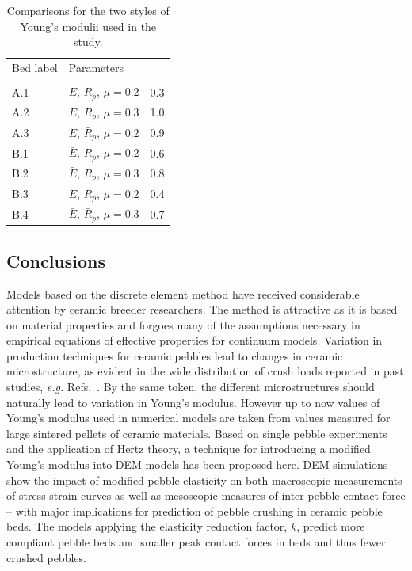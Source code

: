 \begin{table}[t]
\caption{Comparisons for the two styles of Young's modulii used in the study. }
\label{tab:num-crush-percent}\centering
\begin{tabular}{llS[table-format=3.2]}
\toprule
Bed label		& 		Parameters 								&				\\
				& 												&			\\\otoprule
A.1				& 		$E$, $R_p$, $\mu = 0.2$          		&	0.3									\\\midrule
A.2				& 		$E$, $R_p$, $\mu = 0.3$     			&	1.0									\\\midrule
A.3				& 		$E$, $\bar{R}_p$, $\mu = 0.2$			&	0.9									\\\midrule
B.1				& 		$\bar{E}$, $R_p$, $\mu = 0.2$			&	0.6									\\\midrule
B.2				& 		$\bar{E}$, $R_p$, $\mu = 0.3$			&	0.8									\\\midrule
B.3				& 		$\bar{E}$, $\bar{R}_p$, $\mu = 0.2$		&	0.4									\\\midrule
B.4				& 		$\bar{E}$, $\bar{R}_p$, $\mu = 0.3$		&	0.7									\\\bottomrule
\end{tabular}
\end{table}






\subsection{Conclusions}
Models based on the discrete element method have received considerable attention by ceramic breeder researchers. The method is attractive as it is based on material properties and forgoes many of the assumptions necessary in empirical equations of effective properties for continuum models. Variation in production techniques for ceramic pebbles lead to changes in ceramic microstructure, as evident in the wide distribution of crush loads reported in past studies, \textit{e.g.} Refs.~\cite{Zhao2012,Mandal2012a}. By the same token, the different microstructures should naturally lead to variation in Young’s modulus. However up to now values of Young’s modulus used in numerical models are taken from values measured for large sintered pellets of ceramic materials. Based on single pebble experiments and the application of Hertz theory, a technique for introducing a modified Young’s modulus into DEM models has been proposed here. DEM simulations show the impact of modified pebble elasticity on both macroscopic measurements of stress-strain curves as well as mesoscopic measures of inter-pebble contact force – with major implications for prediction of pebble crushing in ceramic pebble beds. The models applying the elasticity reduction factor, $k$, predict more compliant pebble beds and smaller peak contact forces in beds and thus fewer crushed pebbles.